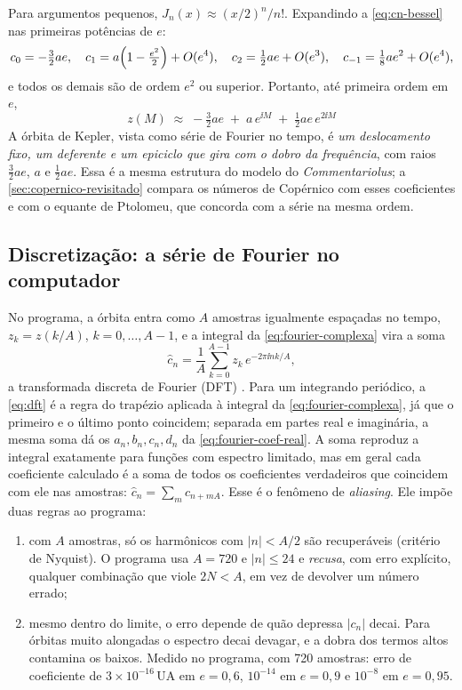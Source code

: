 Para argumentos pequenos, $J_n(x)\approx (x/2)^n/n!$. Expandindo a \autoref{eq:cn-bessel} nas primeiras potências de $e$:
\begin{equation}
  c_0 = -\tfrac32 ae,\quad
  c_1 = a\Bigl(1-\tfrac{e^2}{2}\Bigr) + O(e^4),\quad
  c_2 = \tfrac12 ae + O(e^3),\quad
  c_{-1} = \tfrac18 ae^2 + O(e^4),
  \label{eq:pequeno-e}
\end{equation}
e todos os demais são de ordem $e^2$ ou superior. Portanto, até primeira ordem em $e$,
\begin{equation}
  \boxed{\;z(M) \;\approx\; -\tfrac32 ae \;+\; a\,e^{\ii M} \;+\; \tfrac12 ae\,e^{2\ii M}\;}
  \label{eq:copernico-fourier}
\end{equation}
A órbita de Kepler, vista como série de Fourier no tempo, é \emph{um deslocamento fixo, um deferente e um epiciclo que gira com o dobro da frequência}, com raios $\tfrac32 ae$, $a$ e $\tfrac12 ae$. Essa é a mesma estrutura do modelo do \emph{Commentariolus}; a \autoref{sec:copernico-revisitado} compara os números de Copérnico com esses coeficientes e com o equante de Ptolomeu, que concorda com a série na mesma ordem.


\subsection{Discretização: a série de Fourier no computador}\label{sec:dft}

No programa, a órbita entra como $A$ amostras igualmente espaçadas no tempo, $z_k = z(k/A)$, $k=0,\dots,A-1$, e a integral da \autoref{eq:fourier-complexa} vira a soma
\begin{equation}
  \hat c_n = \frac{1}{A}\sum_{k=0}^{A-1} z_k\,e^{-2\pi\ii nk/A},
  \label{eq:dft}
\end{equation}
a transformada discreta de Fourier (DFT) \cite{press2007}. Para um integrando periódico, a \autoref{eq:dft} é a regra do trapézio aplicada à integral da \autoref{eq:fourier-complexa}, já que o primeiro e o último ponto coincidem; separada em partes real e imaginária, a mesma soma dá os $a_n, b_n, c_n, d_n$ da \autoref{eq:fourier-coef-real}. A soma reproduz a integral exatamente para funções com espectro limitado, mas em geral cada coeficiente calculado é a soma de todos os coeficientes verdadeiros que coincidem com ele nas amostras: $\hat c_n = \sum_{m} c_{n+mA}$. Esse é o fenômeno de \emph{aliasing}. Ele impõe duas regras ao programa:

\begin{enumerate}
  \item com $A$ amostras, só os harmônicos com $|n| < A/2$ são recuperáveis (critério de Nyquist). O programa usa $A = 720$ e $|n|\leq 24$ e \emph{recusa}, com erro explícito, qualquer combinação que viole $2N < A$, em vez de devolver um número errado;
  \item mesmo dentro do limite, o erro depende de quão depressa $|c_n|$ decai. Para órbitas muito alongadas o espectro decai devagar, e a dobra dos termos altos contamina os baixos. Medido no programa, com 720 amostras: erro de coeficiente de $3\times10^{-16}$\,UA em $e = 0{,}6$, $10^{-14}$ em $e = 0{,}9$ e $10^{-8}$ em $e = 0{,}95$.
\end{enumerate}


